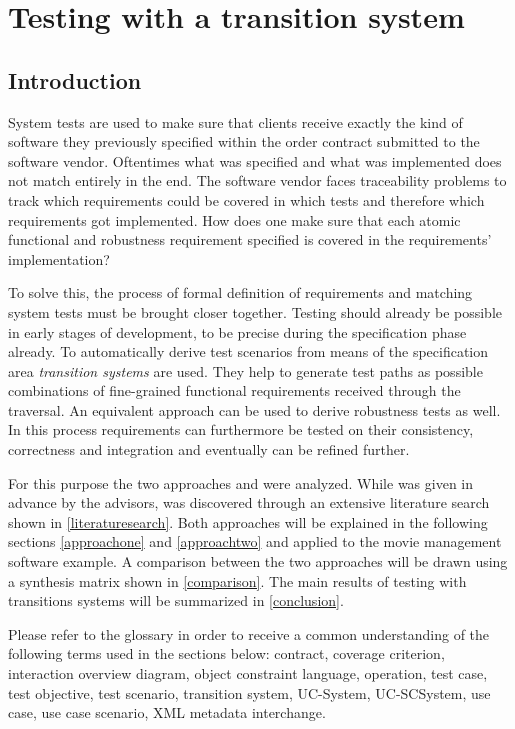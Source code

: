 \chapter{Testing with a transition system}\label{sec:topic_3}

\section{Introduction}

System tests are used to make sure that clients receive exactly the kind of software they previously specified within the order contract submitted to the software vendor. Oftentimes what was specified and what was implemented does not match entirely in the end. The software vendor faces traceability problems to track which requirements could be covered in which tests and therefore which requirements got implemented. How does one make sure that each atomic functional and robustness requirement specified is covered in the requirements' implementation?

To solve this, the process of formal definition of requirements and matching system tests must be brought closer together. Testing should already be possible in early stages of development, to be precise during the specification phase already. To automatically derive test scenarios from means of the specification area \textit{transition systems} are used. They help to generate test paths as possible combinations of fine-grained functional requirements received through the traversal. An equivalent approach can be used to derive robustness tests as well. In this process requirements can furthermore be tested on their consistency, correctness and integration and eventually can be refined further.

For this purpose the two approaches \cite{ClementineNebut2006} and \cite{NajlaRaza2007} were analyzed. While \cite{ClementineNebut2006} was given in advance by the advisors, \cite{NajlaRaza2007} was discovered through an extensive literature search shown in \autoref{literaturesearch}. Both approaches will be explained in the following sections \autoref{approachone} and \autoref{approachtwo} and applied to the movie management software example. A comparison between the two approaches will be drawn using a synthesis matrix shown in \autoref{comparison}. The main results of testing with transitions systems will be summarized in \autoref{conclusion}. 

Please refer to the glossary in order to receive a common understanding of the following terms used in the sections below: contract, coverage criterion, interaction overview diagram, object constraint language, operation, test case, test objective, test scenario, transition system, UC-System, UC-SCSystem, use case, use case scenario, XML metadata interchange.

